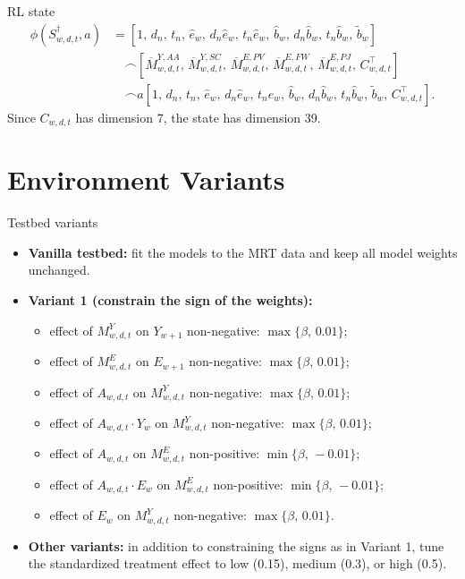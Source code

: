 \documentclass[10pt]{beamer}					%
\begin{document}
\begin{frame}{RL state}
    \begin{align}
\phi(S_{w,d,t}^{\dagger},a)
&=
\left[
1,\,
d_n,\,
t_n,\,
\widehat e_w,\,
d_n\widehat e_w,\,
t_n\widehat e_w,\,
\widehat b_w,\,
d_n\widehat b_w,\,
t_n\widehat b_w,\,
\widetilde b_w
\right] \nonumber\\
&\quad \frown
\left[
\overline{M}^{Y,AA}_{w,d,t},\,
\overline{M}^{Y,SC}_{w,d,t},\,
\overline{M}^{E,PV}_{w,d,t},\,
\overline{M}^{E,FW}_{w,d,t},\,
\overline{M}^{E,PJ}_{w,d,t},\,
C_{w,d,t}^\top
\right] \nonumber\\
&\quad \frown
a
\left[
1,\,
d_n,\,
t_n,\,
\widehat e_w,\,
d_n\widehat e_w,\,
t_n\widehat e_w,\,
\widehat b_w,\,
d_n\widehat b_w,\,
t_n\widehat b_w,\,
\widetilde b_w,\,
C_{w,d,t}^\top
\right].
\label{eq:feature-map}
\end{align}
Since $C_{w,d,t}$ has dimension 7, the state has dimension 39.
\end{frame}

\section{Environment Variants}

\begin{frame}{Testbed variants}
\begin{itemize}
    \item \textbf{Vanilla testbed:} fit the models to the MRT data and keep all model weights unchanged.
    \item \textbf{Variant 1 (constrain the sign of the weights):}
    \begin{itemize}
        \item effect of $M^Y_{w,d,t}$ on $Y_{w+1}$ non-negative: $\max\{\beta,\,0.01\}$;
        \item effect of $M^E_{w,d,t}$ on $E_{w+1}$ non-negative: $\max\{\beta,\,0.01\}$;
        \item effect of $A_{w,d,t}$ on $M^Y_{w,d,t}$ non-negative: $\max\{\beta,\,0.01\}$;
        \item effect of $A_{w,d,t}\cdot Y_w$ on $M^Y_{w,d,t}$ non-negative: $\max\{\beta,\,0.01\}$;
        \item effect of $A_{w,d,t}$ on $M^E_{w,d,t}$ non-positive: $\min\{\beta,\,-0.01\}$;
        \item effect of $A_{w,d,t}\cdot E_w$ on $M^E_{w,d,t}$ non-positive: $\min\{\beta,\,-0.01\}$;
        \item effect of $E_w$ on $M^Y_{w,d,t}$ non-negative: $\max\{\beta,\,0.01\}$.
    \end{itemize}
    \item \textbf{Other variants:} in addition to constraining the signs as in Variant 1, tune the standardized treatment effect to low (0.15), medium (0.3), or high (0.5).
\end{itemize}
\end{frame}
\end{document}
